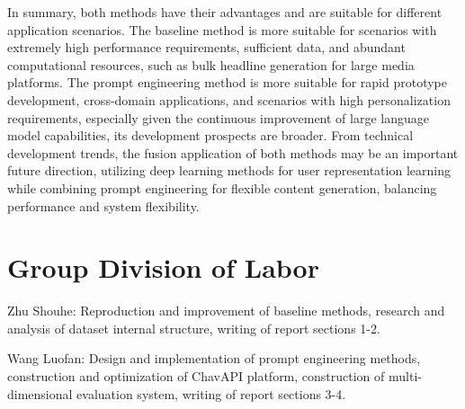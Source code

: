 \documentclass[10pt,a4paper]{article}
\begin{document}
In summary, both methods have their advantages and are suitable for different application scenarios. The baseline method is more suitable for scenarios with extremely high performance requirements, sufficient data, and abundant computational resources, such as bulk headline generation for large media platforms. The prompt engineering method is more suitable for rapid prototype development, cross-domain applications, and scenarios with high personalization requirements, especially given the continuous improvement of large language model capabilities, its development prospects are broader. From technical development trends, the fusion application of both methods may be an important future direction, utilizing deep learning methods for user representation learning while combining prompt engineering for flexible content generation, balancing performance and system flexibility.

\section{Group Division of Labor}
Zhu Shouhe: Reproduction and improvement of baseline methods, research and analysis of dataset internal structure, writing of report sections 1-2.

Wang Luofan: Design and implementation of prompt engineering methods, construction and optimization of ChavAPI platform, construction of multi-dimensional evaluation system, writing of report sections 3-4.
\end{document}
